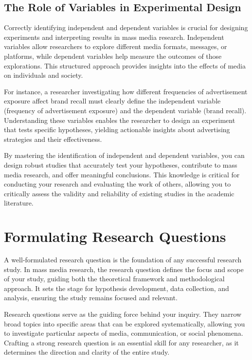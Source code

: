 \documentclass[
]{book}
\begin{document}
\subsection*{The Role of Variables in Experimental Design}\label{the-role-of-variables-in-experimental-design}

Correctly identifying independent and dependent variables is crucial for designing experiments and interpreting results in mass media research. Independent variables allow researchers to explore different media formats, messages, or platforms, while dependent variables help measure the outcomes of those explorations. This structured approach provides insights into the effects of media on individuals and society.

For instance, a researcher investigating how different frequencies of advertisement exposure affect brand recall must clearly define the independent variable (frequency of advertisement exposure) and the dependent variable (brand recall). Understanding these variables enables the researcher to design an experiment that tests specific hypotheses, yielding actionable insights about advertising strategies and their effectiveness.

By mastering the identification of independent and dependent variables, you can design robust studies that accurately test your hypotheses, contribute to mass media research, and offer meaningful conclusions. This knowledge is critical for conducting your research and evaluating the work of others, allowing you to critically assess the validity and reliability of existing studies in the academic literature.

\section{Formulating Research Questions}\label{formulating-research-questions}

A well-formulated research question is the foundation of any successful research study. In mass media research, the research question defines the focus and scope of your study, guiding both the theoretical framework and methodological approach. It sets the stage for hypothesis development, data collection, and analysis, ensuring the study remains focused and relevant.

Research questions serve as the guiding force behind your inquiry. They narrow broad topics into specific areas that can be explored systematically, allowing you to investigate particular aspects of media, communication, or social phenomena. Crafting a strong research question is an essential skill for any researcher, as it determines the direction and clarity of the entire study.
\end{document}
